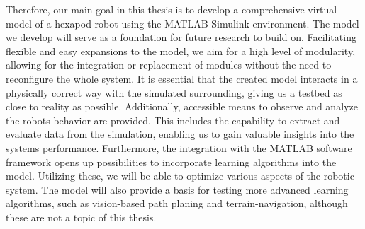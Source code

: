 



Therefore, our main goal in this thesis is to develop a comprehensive virtual model of a hexapod robot using the MATLAB Simulink\textsuperscript{\textregistered} environment.
The model we develop will serve as a foundation for future research to build on.
Facilitating flexible and easy expansions to the model, we aim for a high level of modularity, allowing for the integration or replacement of modules without the need to reconfigure the whole system.
It is essential that the created model interacts in a physically correct way with the simulated surrounding, giving us a testbed as close to reality as possible.
Additionally, accessible means to observe and analyze the robots behavior are provided.
This includes the capability to extract and evaluate data from the simulation, enabling us to gain valuable insights into the systems performance.
Furthermore, the integration with the MATLAB software framework opens up possibilities to incorporate learning algorithms into the model.
Utilizing these, we will be able to optimize various aspects of the robotic system. 
The model will also provide a basis for testing more advanced learning algorithms, such as vision-based path planing and terrain-navigation, although these are not a topic of this thesis.

